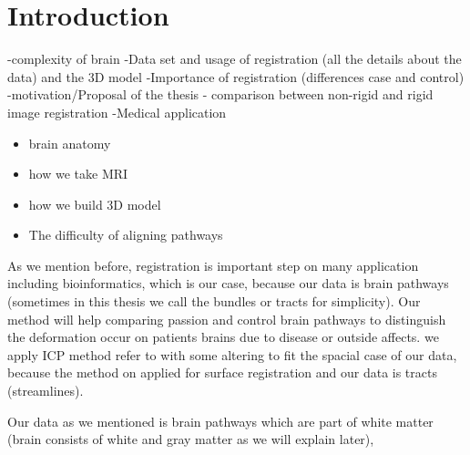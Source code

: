 \documentclass[../structure.tex]{subfiles}
\begin{document}
\chapter{Introduction}

-complexity of brain
-Data set and usage of registration (all the details about the data) and the 3D model
-Importance of registration (differences case and control)
-motivation/Proposal of the thesis - comparison between non-rigid and rigid image registration 
-Medical application

\begin{itemize}
\item brain anatomy
\item how we take MRI
\item how we build 3D model
\item The difficulty of aligning pathways

\end{itemize}

As we mention before, registration is important step on many application including bioinformatics, which is our case, because our data is brain pathways (sometimes in this thesis we call the bundles or tracts for simplicity). Our method will help comparing passion and control brain pathways to distinguish the deformation occur on patients brains due to disease or outside affects. we apply ICP method refer to \cite{Amberg2007} with some altering to fit the spacial case of our data, because the method on \cite{Amberg2007} applied for surface registration and our data is tracts (streamlines).

Our data as we mentioned is brain pathways which are part of white matter (brain consists of white and gray matter as we will explain later), 
\end{document}
